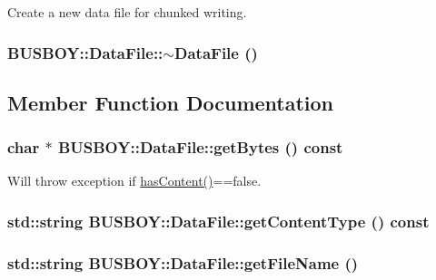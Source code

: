 Create a new data file for chunked writing. \hypertarget{classBUSBOY_1_1DataFile_a6354d7e99724c107edb8167a0b16bbd3}{
\subsubsection[{$\sim$DataFile}]{\setlength{\rightskip}{0pt plus 5cm}BUSBOY::DataFile::$\sim$DataFile ()}}
\label{classBUSBOY_1_1DataFile_a6354d7e99724c107edb8167a0b16bbd3}


\subsection{Member Function Documentation}
\hypertarget{classBUSBOY_1_1DataFile_a45fde9d4a579facec44247df8d15aaff}{
\subsubsection[{getBytes}]{\setlength{\rightskip}{0pt plus 5cm}char $\ast$ BUSBOY::DataFile::getBytes () const}}
\label{classBUSBOY_1_1DataFile_a45fde9d4a579facec44247df8d15aaff}


Will throw exception if \hyperlink{classBUSBOY_1_1DataFile_aa127c5ce6db57b3e35151a2c44404f0a}{hasContent()}==false. \hypertarget{classBUSBOY_1_1DataFile_a76a0325c8a1f8be6bf74ed077522e6ec}{
\subsubsection[{getContentType}]{\setlength{\rightskip}{0pt plus 5cm}std::string BUSBOY::DataFile::getContentType () const}}
\label{classBUSBOY_1_1DataFile_a76a0325c8a1f8be6bf74ed077522e6ec}
\hypertarget{classBUSBOY_1_1DataFile_abde2b0c80581b418b9bd2fa70e865e05}{
\subsubsection[{getFileName}]{\setlength{\rightskip}{0pt plus 5cm}std::string BUSBOY::DataFile::getFileName ()}}
\label{classBUSBOY_1_1DataFile_abde2b0c80581b418b9bd2fa70e865e05}


